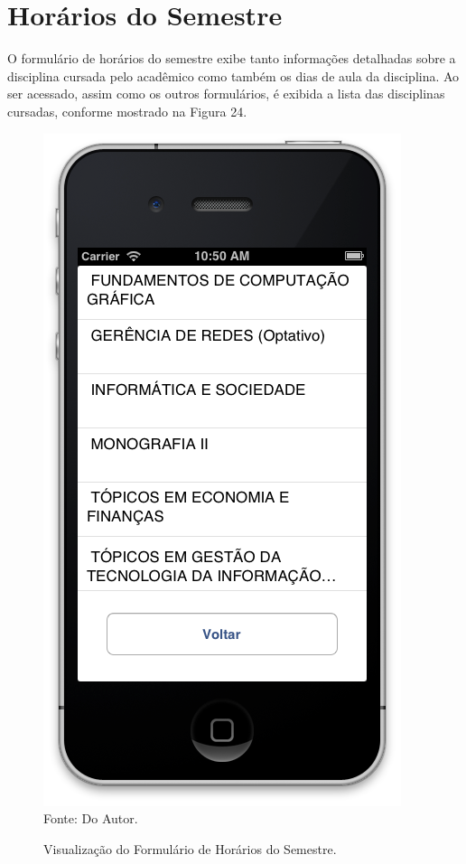 \section{Horários do Semestre}
O formulário de horários do semestre exibe tanto informações detalhadas sobre a disciplina cursada pelo acadêmico como também os dias de aula da disciplina. Ao ser acessado, assim como os outros formulários, é exibida a lista das disciplinas cursadas, conforme mostrado na Figura 24.
\begin{figure}[!htb]
     \centering
     \caption[Formulário Horários do Semestre - Lista das Disciplinas]{Visualização do Formulário de Horários do Semestre.}
     \includegraphics[scale=0.5]{imagens/formhorariosemestre.png}
     \\  Fonte: Do Autor.
\end{figure}
\newpage

